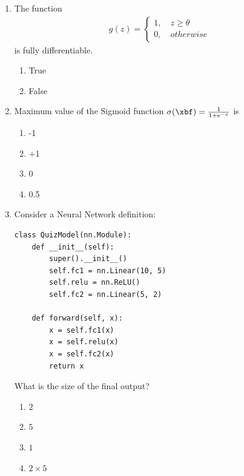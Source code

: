 \documentclass[11pt, xcolor=dvipsnames,svgnames,x11names]{article}
\begin{document}
\begin{enumerate}
\begin{enumerate}
\item cd
\item mkdir
\item ls
\item mv
\end{enumerate}

\item The function 
\begin{align*}
g(z) = \begin{cases}
1, \quad z \geq \theta\\
0, \quad otherwise
\end{cases}
\end{align*}
is fully differentiable.

\begin{enumerate}
\item True
\item False
\end{enumerate}

\item Maximum value of the Sigmoid function $\sigma(\xbf) = \frac{1}{1 + e^{-x}}$ is

\begin{enumerate}
\item -1
\item +1
\item 0 
\item 0.5
\end{enumerate}

\item Consider a Neural Network definition:

          \begin{verbatim}
class QuizModel(nn.Module):
    def __init__(self):
        super().__init__()
        self.fc1 = nn.Linear(10, 5)
        self.relu = nn.ReLU()
        self.fc2 = nn.Linear(5, 2)

    def forward(self, x):
        x = self.fc1(x)
        x = self.relu(x)
        x = self.fc2(x)
        return x
\end{verbatim}

What is the size of the final output?

\begin{enumerate}
\item $2$
\item $5$
\item $1$
\item $2\times 5$
\end{enumerate}



\end{enumerate}
\end{document}
